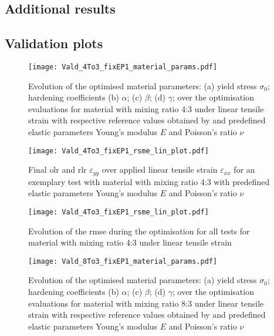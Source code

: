 \begin{appendices}
    \chapter{Additional results} \label{app:additionalResults}
    \section{Validation plots} \label{app:verifResults}

    \begin{figure}[H]
    \centering
    \texttt{[image: Vald\_4To3\_fixEP1\_material\_params.pdf]}
    \caption{Evolution of the optimised material parameters: (a) yield stress $\sigma_0$; hardening coefficients (b) $\alpha$; (c) $\beta$; (d) $\gamma$; over the optimisation evaluations for material with mixing ratio 4:3 under linear tensile strain with respective reference values obtained by \citet{ries_deciphering_nodate} and predefined elastic parameters Young's modulus $E$ and Poisson's ratio $\nu$}
    \label{fig:material_params_4to3}
    \end{figure}
    
    \begin{figure}[H]
    \centering
    \texttt{[image: Vald\_4To3\_fixEP1\_rsme\_lin\_plot.pdf]}
    \caption{Final \acrlong{olr} and \acrfull{rlr} $\varepsilon_{yy}$ over applied linear tensile strain $\varepsilon_{xx}$ for an exemplary test with material with mixing ratio 4:3 with predefined elastic parameters Young's modulus $E$ and Poisson's ratio $\nu$}
    \label{fig:strain_strain_4to3}
    \end{figure}

    \begin{figure}[H]
    \centering
    \texttt{[image: Vald\_4To3\_fixEP1\_rsme\_lin\_plot.pdf]}
    \caption{Evolution of the \acrfull{rmse} during the optimisation for all tests for material with mixing ratio 4:3 under linear tensile strain}
    \label{fig:verfifRMSE43}
    \end{figure}

    \begin{figure}[H]
    \centering
    \texttt{[image: Vald\_8To3\_fixEP1\_material\_params.pdf]}
    \caption{Evolution of the optimised material parameters: (a) yield stress $\sigma_0$; hardening coefficients (b) $\alpha$; (c) $\beta$; (d) $\gamma$; over the optimisation evaluations for material with mixing ratio 8:3 under linear tensile strain with respective reference values obtained by \citet{ries_deciphering_nodate} and predefined elastic parameters Young's modulus $E$ and Poisson's ratio $\nu$}
    \label{fig:material_params_8to3}
    \end{figure}


\end{appendices}
